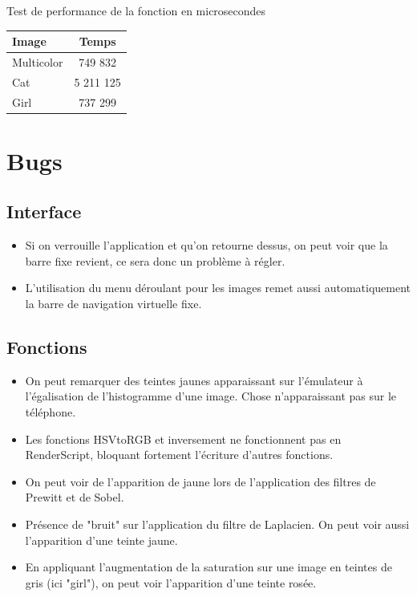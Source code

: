 \documentclass{article}
\begin{document}
\begin{center}
\medbreak
Test de performance de la fonction en microsecondes
\bigbreak
   \begin{tabular}{ | l | c | }
     \hline
     Image & Temps \\
     \hline
     Multicolor & 749 832 \\
     \hline
     Cat & 5 211 125 \\
     \hline
     Girl & 737 299 \\
     \hline
   \end{tabular}
 \end{center}

\newpage
\section{Bugs}

\subsection{Interface}
\begin{itemize}
   
 \item Si on verrouille l'application et qu'on retourne dessus, on peut voir que la barre fixe revient, ce sera donc un problème à régler. 
    \item L'utilisation du menu déroulant pour les images remet aussi automatiquement la barre de navigation virtuelle fixe.
\end{itemize}

\subsection{Fonctions}
\begin{itemize}
    \item On peut remarquer des teintes jaunes apparaissant sur l'émulateur à l'égalisation de l'histogramme d'une image. Chose n'apparaissant pas sur le téléphone.
    \item Les fonctions HSVtoRGB et inversement ne fonctionnent pas en RenderScript, bloquant fortement l'écriture d'autres fonctions.
    \item On peut voir de l'apparition de jaune lors de l'application des filtres de Prewitt et de Sobel.
    \item Présence de "bruit" sur l'application du filtre de Laplacien. On peut voir aussi l'apparition d'une teinte jaune.
    \item En appliquant l'augmentation de la saturation sur une image en teintes de gris (ici "girl"), on peut voir l'apparition d'une teinte rosée.
\end{itemize}
\end{document}
